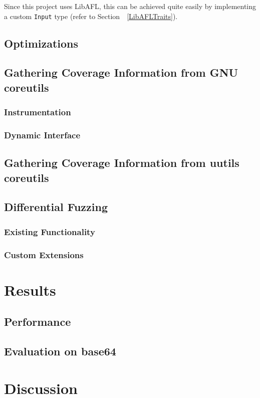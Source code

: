 \documentclass{article}
\newcommand{\code}[1]{\texttt{#1}}
\let\savedRef=\ref
\renewcommand{\ref}{\unskip~\savedRef}
\begin{document}
\begin{multicols}{2}
    Since this project uses LibAFL, this can be achieved quite easily by implementing a custom \code{Input} type (refer to Section~\ref{LibAFLTraits}).

    \subsection{Optimizations}
    \subsection{Gathering Coverage Information from GNU coreutils}
    \subsubsection{Instrumentation}
    \subsubsection{Dynamic Interface}
    \subsection{Gathering Coverage Information from uutils coreutils}
    \subsection{Differential Fuzzing}
    \subsubsection{Existing Functionality}
    \subsubsection{Custom Extensions}

    \section{Results}
    \subsection{Performance}
    \subsection{Evaluation on base64}

    \section{Discussion}

\end{multicols}
\end{document}
